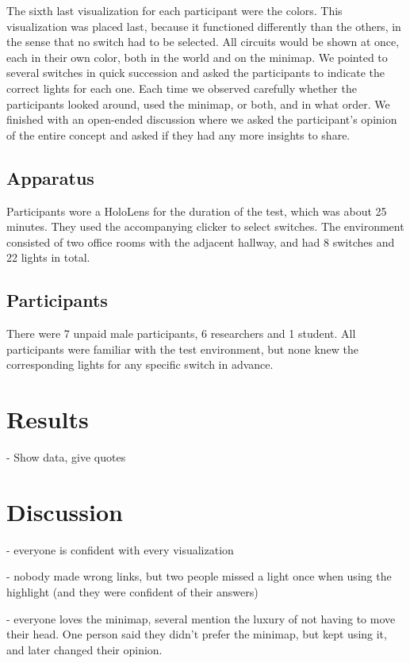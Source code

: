 The sixth last visualization for each participant were the colors. This visualization was placed last, because it functioned differently than the others, in the sense that no switch had to be selected. All circuits would be shown at once, each in their own color, both in the world and on the minimap. We pointed to several switches in quick succession and asked the participants to indicate the correct lights for each one. Each time we observed carefully whether the participants looked around, used the minimap, or both, and in what order. We finished with an open-ended discussion where we asked the participant's opinion of the entire concept and asked if they had any more insights to share.

\subsection{Apparatus} \label{subsec:user:survey:apparatus}
Participants wore a HoloLens for the duration of the test, which was about 25 minutes. They used the accompanying clicker to select switches. The environment consisted of two office rooms with the adjacent hallway, and had 8 switches and 22 lights in total.

\subsection{Participants} \label{subsec:user:survey:participants}
There were 7 unpaid male participants, 6 researchers and 1 student. All participants were familiar with the test environment, but none knew the corresponding lights for any specific switch in advance.

\section{Results} \label{sec:user:results}
- Show data, give quotes

\section{Discussion} \label{sec:user:discussion}
- everyone is confident with every visualization

- nobody made wrong links, but two people missed a light once when using the highlight (and they were confident of their answers)

- everyone loves the minimap, several mention the luxury of not having to move their head. One person said they didn't prefer the minimap, but kept using it, and later changed their opinion.

